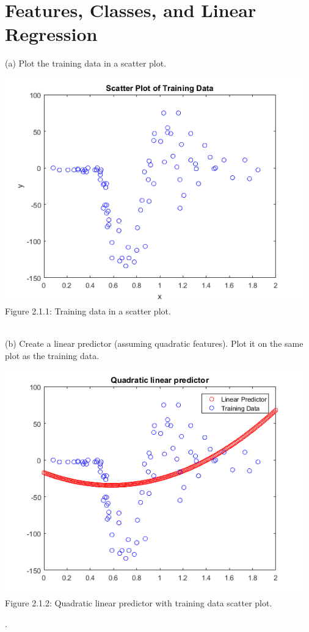 \documentclass[]{report}   %
\begin{document}
\section{Features, Classes, and Linear Regression}
(a) Plot the training data in a scatter plot.
\begin{center}
	\includegraphics[width=35em]{2_1_Figure_1.png}
	{Figure 2.1.1: Training data in a scatter plot.}
\end{center} 
~\\
(b) Create a linear predictor (assuming quadratic features). Plot it on the same plot as the training data.
\begin{center}
	\includegraphics[width=35em]{2_1_Figure_2.png}
	{Figure 2.1.2: Quadratic linear predictor with training data scatter plot.}
\end{center}.
\end{document}
